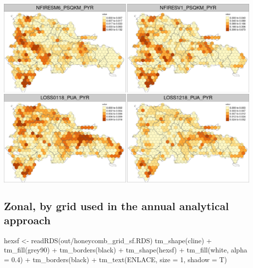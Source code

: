 \documentclass[10pt,landscape,a3paper]{article}
\newenvironment{Shaded}{\begin{snugshade}}{\end{snugshade}}
\newcommand{\AttributeTok}[1]{\textcolor[rgb]{0.77,0.63,0.00}{#1}}
\newcommand{\DecValTok}[1]{\textcolor[rgb]{0.00,0.00,0.81}{#1}}
\newcommand{\FloatTok}[1]{\textcolor[rgb]{0.00,0.00,0.81}{#1}}
\newcommand{\FunctionTok}[1]{\textcolor[rgb]{0.00,0.00,0.00}{#1}}
\newcommand{\NormalTok}[1]{#1}
\newcommand{\OtherTok}[1]{\textcolor[rgb]{0.56,0.35,0.01}{#1}}
\newcommand{\SpecialCharTok}[1]{\textcolor[rgb]{0.00,0.00,0.00}{#1}}
\newcommand{\StringTok}[1]{\textcolor[rgb]{0.31,0.60,0.02}{#1}}
\begin{document}
\begin{center}\includegraphics{img/data-download-preparation-eda/zonal-long-term-grid-15} \end{center}

\hypertarget{zonal-by-grid-used-in-the-annual-analytical-approach}{%
\subsection{Zonal, by grid used in the annual analytical
approach}\label{zonal-by-grid-used-in-the-annual-analytical-approach}}

\begin{Shaded}
\begin{Highlighting}[]
\NormalTok{hexsf }\OtherTok{\textless{}{-}} \FunctionTok{readRDS}\NormalTok{(}\StringTok{\textquotesingle{}out/honeycomb\_grid\_sf.RDS\textquotesingle{}}\NormalTok{)}
\FunctionTok{tm\_shape}\NormalTok{(cline) }\SpecialCharTok{+}
  \FunctionTok{tm\_fill}\NormalTok{(}\StringTok{\textquotesingle{}grey90\textquotesingle{}}\NormalTok{) }\SpecialCharTok{+}
  \FunctionTok{tm\_borders}\NormalTok{(}\StringTok{\textquotesingle{}black\textquotesingle{}}\NormalTok{) }\SpecialCharTok{+}
  \FunctionTok{tm\_shape}\NormalTok{(hexsf) }\SpecialCharTok{+}
  \FunctionTok{tm\_fill}\NormalTok{(}\StringTok{\textquotesingle{}white\textquotesingle{}}\NormalTok{, }\AttributeTok{alpha =} \FloatTok{0.4}\NormalTok{) }\SpecialCharTok{+} 
  \FunctionTok{tm\_borders}\NormalTok{(}\StringTok{\textquotesingle{}black\textquotesingle{}}\NormalTok{) }\SpecialCharTok{+}
  \FunctionTok{tm\_text}\NormalTok{(}\StringTok{\textquotesingle{}ENLACE\textquotesingle{}}\NormalTok{, }\AttributeTok{size =} \DecValTok{1}\NormalTok{, }\AttributeTok{shadow =}\NormalTok{ T)}
\end{Highlighting}
\end{Shaded}
\end{document}
